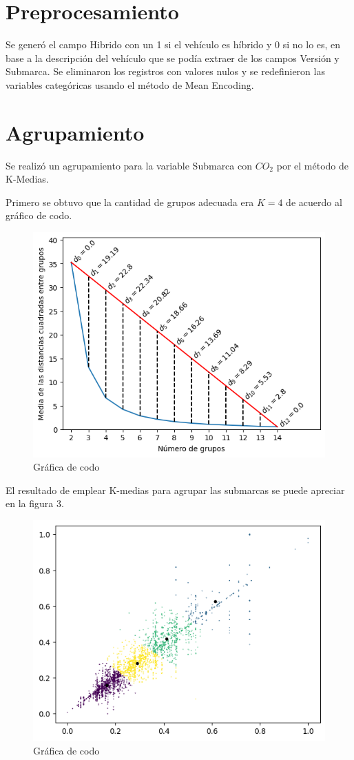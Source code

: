\documentclass{article}
\begin{document}
\section{Preprocesamiento}

Se generó el campo Hibrido con un 1 si el vehículo es híbrido y 0 si no lo es, en base a la descripción del vehículo que se podía extraer de los campos Versión y Submarca. Se eliminaron los registros con valores nulos y se redefinieron las variables categóricas usando el método de Mean Encoding.


\section{Agrupamiento}

Se realizó un agrupamiento para la variable Submarca con $CO_2$ por el método de K-Medias.

Primero se obtuvo que la cantidad de grupos adecuada era $K=4$ de acuerdo al gráfico de codo.

\begin{figure}[h]
  \centering
  \includegraphics[width=.7\linewidth]{imagenes/2_codo.png}
  \caption{Gráfica de codo}
  \label{fig:nombre}
\end{figure}

\newpage

El resultado de emplear K-medias para agrupar las submarcas se puede apreciar en la figura 3.

\begin{figure}[h]
  \centering
  \includegraphics[width=.65\linewidth]{imagenes/3_k-medias.png}
  \caption{Gráfica de codo}
  \label{fig:nombre}
\end{figure}
\end{document}

